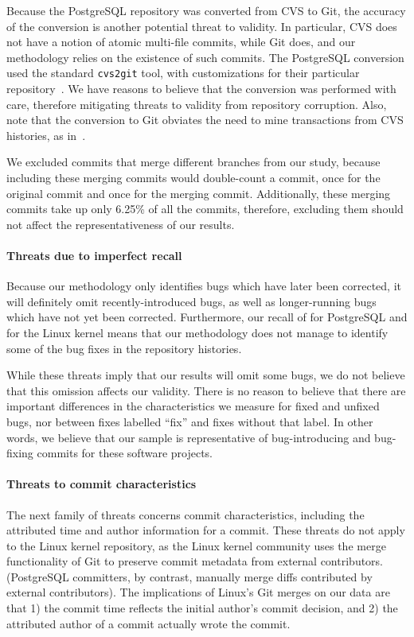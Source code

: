 Because the PostgreSQL repository was converted from CVS to Git, the accuracy of
the conversion is another potential threat to validity.  In particular, CVS does
not have a notion of atomic multi-file commits, while Git does, and our
methodology relies on the existence of such commits. The PostgreSQL conversion
used the standard {\tt cvs2git} tool, with customizations for their particular
repository~\cite{haas09:_so_why_postg_using_git}. We have reasons to believe
that the conversion was performed with care, therefore mitigating threats to
validity from repository corruption.  Also, note that the conversion to Git
obviates the need to mine transactions from CVS histories, as
in~\cite{zimmermann-msr-2004}.

We excluded commits that merge different branches from our study, because
including these merging commits would double-count a commit, once for the
original commit and once for the merging commit.  Additionally, these merging
commits take up only 6.25\% of all the commits, therefore, excluding them should
not affect the representativeness of our results.

\paragraph{Threats due to imperfect recall}

Because our methodology only identifies bugs which have later been corrected, it
will definitely omit recently-introduced bugs, as well as longer-running bugs
which have not yet been corrected. Furthermore, our recall of \postR for
PostgreSQL and \linuxR for the Linux kernel means that our methodology does not
manage to identify some of the bug fixes in the repository histories.

While these threats imply that our results will omit some bugs, we do not
believe that this omission affects our validity. There is no reason to believe
that there are important differences in the characteristics we measure for fixed
and unfixed bugs, nor between fixes labelled ``fix'' and fixes without that
label. In other words, we believe that our sample is representative of
bug-introducing and bug-fixing commits for these software projects.

\paragraph{Threats to commit characteristics}

The next family of threats concerns commit characteristics, including the
attributed time and author information for a commit.  These threats do not apply
to the Linux kernel repository, as the Linux kernel community uses the merge
functionality of Git to preserve commit metadata from external
contributors. (PostgreSQL committers, by contrast, manually merge diffs
contributed by external contributors).  The implications of Linux's Git merges
on our data are that 1) the commit time reflects the initial author's commit
decision, and 2) the attributed author of a commit actually wrote the commit.


